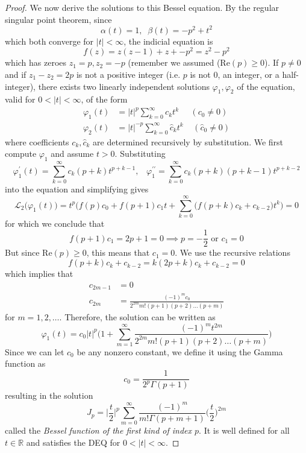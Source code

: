 \documentclass{article}
\theoremstyle{remark}
\theoremstyle{definition}
\begin{document}
\begin{proof}
We now derive the solutions to this Bessel equation. By the regular singular point theorem, since
\[\alpha (t) = 1, \;\; \beta(t) = -p^2 + t^2\]
which both converge for $|t|<\infty$, the indicial equation is 
\[f(z) = z(z-1) + z + -p^2 = z^2 - p^2\]
which has zeroes $z_1 = p, z_2 = -p$ (remember we assumed (Re$(p) \geq 0$). If $p \neq 0$ and if $z_1 - z_2 = 2p$ is not a positive integer (i.e. $p$ is not $0$, an integer, or a half-integer), there exists two linearly independent solutions $\varphi_1, \varphi_2$ of the equation, valid for $0<|t|<\infty$, of the form
\begin{align*}
    \varphi_1 (t) & = |t|^p \sum_{k=0}^\infty c_k t^k \;\;\;\;\; (c_0 \neq 0) \\
    \varphi_2 (t) & = |t|^{-p} \sum_{k=0}^\infty \hat{c}_k t^k \;\;\;\; (\hat{c}_0 \neq 0)
\end{align*}
where coefficients $c_k, \hat{c}_k$ are determined recursively by substitution. We first compute $\varphi_1$ and assume $t>0$. Substituting
\[\varphi_1^\prime (t) = \sum_{k=0}^\infty c_k (p+k) t^{p+k-1}, \;\;\; \varphi_1^{\prime\prime} = \sum_{k=0}^\infty c_k (p+k) (p+k-1) t^{p+k-2}\]
into the equation and simplifying gives
\[\mathcal{L}_2 \big( \varphi_1 (t)\big) = t^p \bigg( f(p) c_0 + f(p+1) c_1 t + \sum_{k=0}^\infty \big( f(p+k) c_k + c_{k-2}\big) t^k \bigg) = 0\]
for which we conclude that 
\[f(p+1) c_1 = 2p + 1 = 0 \implies p = -\frac{1}{2} \text{ or } c_1 = 0\]
But since Re$(p)\geq 0$, this means that $c_1 = 0$. We use the recursive relations
\[f(p+k) c_k + c_{k-2} = k (2p+k) c_k + c_{k-2} = 0\]
which implies that
\begin{align*}
    c_{2m-1} & = 0 \\
    c_{2m} & = \frac{(-1)^m c_0}{2^{2m} m! (p+1)(p+2) \ldots (p+m)} 
\end{align*}
for $m = 1, 2, \ldots$. Therefore, the solution can be written as
\[\varphi_1 (t) = c_0 |t|^p \Bigg( 1 + \sum_{m=1}^\infty \frac{(-1)^m t^{2m}}{2^{2m} m! (p+1) (p+2) \ldots (p+m)} \Bigg)\]
Since we can let $c_0$ be any nonzero constant, we define it using the Gamma function as
\[c_0 = \frac{1}{2^p \Gamma(p+1)}\]
resulting in the solution
\[J_p = \bigg| \frac{t}{2}\bigg|^p \sum_{m=0}^\infty \frac{(-1)^m}{m! \Gamma(p+m+1)} \bigg(\frac{t}{2}\bigg)^{2m}\]
called the \textit{Bessel function of the first kind of index $p$}. It is well defined for all $t \in \mathbb{R}$ and satisfies the DEQ for $0 < |t| < \infty$. 
\end{proof}
\end{document}
